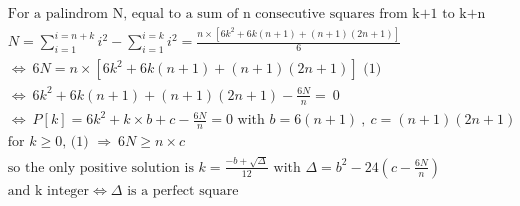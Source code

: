 \documentclass[10pt,a4paper]{letter}
\begin{document}
\begin{align*}
	&\text{For a palindrom N, equal to a sum of n consecutive squares from k+1 to k+n}\\	
	&N=\sum_{i=1}^{i=n+k}i^2-\sum_{i=1}^{i=k}i^2=\frac{n\times [6 k^2 + 6 k(n+1) + (n+1)(2 n+1) ]}{6}\\
	&\Leftrightarrow \ 6N=n\times [6 k^2 + 6 k(n+1) + (n+1)(2 n+1) ] \text{ (1)}\\
	&\Leftrightarrow \  6 k^2 + 6 k(n+1) + (n+1)(2 n+1)-\frac{6N}{n} =\ 0\\
	&\Leftrightarrow \ P[k]=6 k^2 + k \times b + c -\frac{6N}{n} = 0\text { with }b=6(n+1)\ ,\ c=(n+1)(2 n+1)\\
	&\text{for }k\geqslant 0\text{, (1) }\Rightarrow\ 6N\geqslant n\times c\\
	&\text{so the only positive solution is } k=\frac{-b+\sqrt{\Delta}}{12} \text{ with }\Delta=b^2-24( c -\frac{6N}{n})\\
	&\text{and k integer} \Longleftrightarrow \Delta \text{ is a perfect square}\\
\end{align*}
\end{document}
